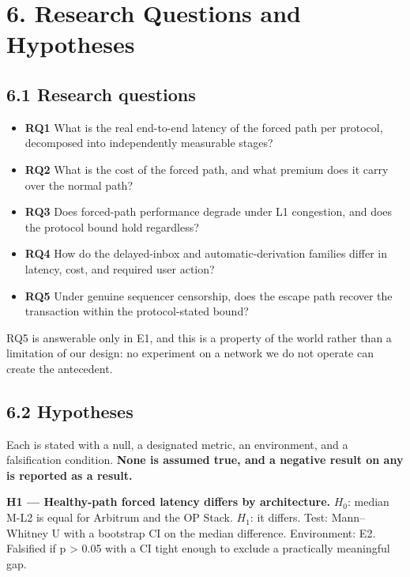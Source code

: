 \documentclass[conference]{IEEEtran}
\providecommand{\tightlist}{\setlength{\itemsep}{0pt}\setlength{\parskip}{0pt}}
\renewcommand{\_}{\textunderscore\allowbreak}
\begin{document}
\section{6. Research Questions and
Hypotheses}\label{research-questions-and-hypotheses}

\subsection{6.1 Research questions}\label{research-questions}

\begin{itemize}
\tightlist
\item
  \textbf{RQ1} What is the real end-to-end latency of the forced path
  per protocol, decomposed into independently measurable stages?
\item
  \textbf{RQ2} What is the cost of the forced path, and what premium
  does it carry over the normal path?
\item
  \textbf{RQ3} Does forced-path performance degrade under L1 congestion,
  and does the protocol bound hold regardless?
\item
  \textbf{RQ4} How do the delayed-inbox and automatic-derivation
  families differ in latency, cost, and required user action?
\item
  \textbf{RQ5} Under genuine sequencer censorship, does the escape path
  recover the transaction within the protocol-stated bound?
\end{itemize}

RQ5 is answerable only in E1, and this is a property of the world rather
than a limitation of our design: no experiment on a network we do not
operate can create the antecedent.

\subsection{6.2 Hypotheses}\label{hypotheses}

Each is stated with a null, a designated metric, an environment, and a
falsification condition. \textbf{None is assumed true, and a negative
result on any is reported as a result.}

\textbf{H1 --- Healthy-path forced latency differs by architecture.}
\(H_0\): median M-L2 is equal for Arbitrum and the OP Stack. \(H_1\): it
differs. Test: Mann--Whitney U with a bootstrap CI on the median
difference. Environment: E2. Falsified if p \textgreater{} 0.05 with a
CI tight enough to exclude a practically meaningful gap.
\end{document}
